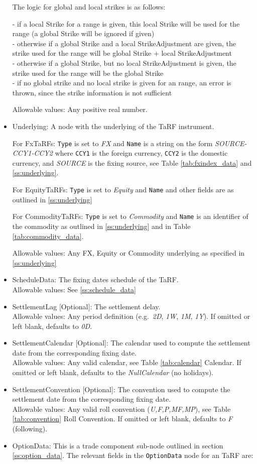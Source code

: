 \begin{itemize}
The logic for global and local strikes is as follows:

- if a local Strike for a range is given, this local Strike will be used for the range (a global Strike will be ignored if given)\\
- otherwise if a global Strike and a local StrikeAdjustment are given, the strike used for the range will be global Strike + local StrikeAdjustment\\
- otherwise if a global Strike, but no local StrikeAdjustment is given, the strike used for the range will be the global Strike\\
- if no global strike and no local strike is given for an range, an error is thrown, since the strike information is not sufficient
    
      Allowable values: Any positive real number. 
    \item Underlying: A node with the underlying of the TaRF instrument.

For FxTaRFs: \lstinline!Type! is set to \emph{FX} and \lstinline!Name! is a string on the form \emph{SOURCE-CCY1-CCY2} where \lstinline!CCY1! is the foreign currency, \lstinline!CCY2! is the domestic currency, and \emph{SOURCE} is the fixing source, see Table \ref{tab:fxindex_data} and  \ref{ss:underlying}.

For EquityTaRFs: \lstinline!Type! is set to \emph{Equity} and \lstinline!Name! and other fields are as outlined in \ref{ss:underlying}

For CommodityTaRFs: \lstinline!Type! is set to \emph{Commodity} and \lstinline!Name! is an identifier of the commodity as outlined in \ref{ss:underlying} and in Table \ref{tab:commodity_data}.

      Allowable values: Any FX, Equity or Commodity underlying as specified in \ref{ss:underlying}
    \item ScheduleData: The fixing dates schedule of the TaRF.\\
      Allowable values: See \ref{ss:schedule_data}
    \item SettlementLag [Optional]: The settlement delay. \\
      Allowable values: Any period definition (e.g.\ \emph{2D}, \emph{1W}, \emph{1M}, \emph{1Y}). If omitted or left blank, defaults to \emph{0D}.
    \item SettlementCalendar [Optional]: The calendar used to compute the settlement date from the corresponding fixing date. \\
      Allowable values: Any valid calendar, see Table \ref{tab:calendar} Calendar. If omitted or left blank, defaults to the \emph{NullCalendar} (no holidays).
    \item SettlementConvention [Optional]: The convention used to compute the settlement date from the corresponding fixing date. \\
      Allowable values: Any valid roll convention (\emph{U,F,P,MF,MP}), see Table \ref{tab:convention} Roll Convention. If omitted or left blank, defaults to \emph{F} (following).
    \item OptionData: This is a trade component sub-node outlined in section \ref{ss:option_data}. 
The relevant fields in the \lstinline!OptionData! node for an TaRF are:


\end{itemize}
